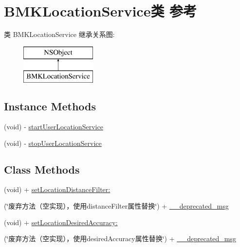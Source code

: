 \hypertarget{interface_b_m_k_location_service}{}\section{B\+M\+K\+Location\+Service类 参考}
\label{interface_b_m_k_location_service}
类 B\+M\+K\+Location\+Service 继承关系图\+:\begin{figure}[H]
\begin{center}
\leavevmode
\includegraphics[height=2.000000cm]{interface_b_m_k_location_service}
\end{center}
\end{figure}
\subsection*{Instance Methods}
\begin{DoxyCompactItemize}
\item 
(void) -\/ \hyperlink{interface_b_m_k_location_service_a3b49abd4104d23a114b7a7a632ff3722}{start\+User\+Location\+Service}
\item 
(void) -\/ \hyperlink{interface_b_m_k_location_service_a1aece8fbe579debdd0984147e036e947}{stop\+User\+Location\+Service}
\end{DoxyCompactItemize}
\subsection*{Class Methods}
\begin{DoxyCompactItemize}
\item 
(void) + \hyperlink{interface_b_m_k_location_service_a603b1a38b6a7d57d758a61e5acbbce6d}{set\+Location\+Distance\+Filter\+:}
\item 
(\char`\"{}废弃方法（空实现），使用distance\+Filter属性替换\char`\"{}) + \hyperlink{interface_b_m_k_location_service_a978bac65e039cf58117e9a69ea259c59}{\+\_\+\+\_\+deprecated\+\_\+msg}
\item 
(void) + \hyperlink{interface_b_m_k_location_service_ae3578982463cddc3c6abac2644e6bfb4}{set\+Location\+Desired\+Accuracy\+:}
\item 
(\char`\"{}废弃方法（空实现），使用desired\+Accuracy属性替换\char`\"{}) + \hyperlink{interface_b_m_k_location_service_ad19fcf8c6b43617bd0f8771aafdc744e}{\+\_\+\+\_\+deprecated\+\_\+msg}
\end{DoxyCompactItemize}
